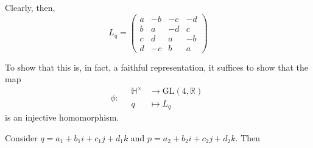 \documentclass[12pt]{article}
\newcommand{\R}{\mathbb{R}}
\newcommand{\GL}{\text{GL}}
\newcommand{\Ha}{\mathbb{H}}
\begin{document}
        Clearly, then, 
        \[L_q = \begin{pmatrix}
            a & -b & -c & -d\\ 
            b & a & -d & c\\ 
            c & d & a & -b\\ 
            d & -c & b & a
        \end{pmatrix}\]

        To show that this is, in fact, a faithful representation, it suffices to show that the map 
        \[\phi:\quad \begin{aligned}
            \Ha^{\times} &\to \GL(4, \R)\\
            q &\mapsto L_q
        \end{aligned}\]
        is an injective homomorphism. 

        Consider $q = a_1 + b_1i + c_1j + d_1k$ and $p = a_2 + b_2i + c_2j + d_2k$. Then 
        
\end{document}
